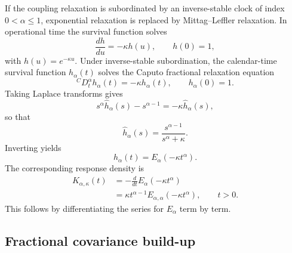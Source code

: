 \documentclass[5p,final]{elsarticle}
\begin{document}
If the coupling relaxation is subordinated by an inverse-stable clock of index $0<\alpha\leq1$, exponential relaxation is replaced by Mittag--Leffler relaxation. In operational time the survival function solves \cite{Haubold2011MittagLeffler}
\begin{equation}
\frac{dh}{du}=-\kappa h(u),
\qquad h(0)=1,
\end{equation}
with $h(u)=e^{-\kappa u}$.  Under inverse-stable subordination, the calendar-time survival function $h_\alpha(t)$ solves the Caputo fractional relaxation equation
\begin{equation}
{}^C D_t^\alpha h_\alpha(t)=-\kappa h_\alpha(t),
\qquad h_\alpha(0)=1.
\end{equation}
Taking Laplace transforms gives
\begin{equation}
s^\alpha\widehat h_\alpha(s)-s^{\alpha-1}
=-\kappa\widehat h_\alpha(s),
\end{equation}
so that
\begin{equation}
\widehat h_\alpha(s)=\frac{s^{\alpha-1}}{s^\alpha+\kappa}.
\end{equation}
Inverting yields
\begin{equation}
h_\alpha(t)=E_\alpha(-\kappa t^\alpha).
\end{equation}
The corresponding response density is
\begin{align}
K_{\alpha,\kappa}(t)
&=-\frac{d}{dt}E_\alpha(-\kappa t^\alpha)\\
&=\kappa t^{\alpha-1}E_{\alpha,\alpha}(-\kappa t^\alpha),
\qquad t>0.
\end{align}
This follows by differentiating the series for $E_\alpha$ term by term.

\subsection{Fractional covariance build-up}
\end{document}
